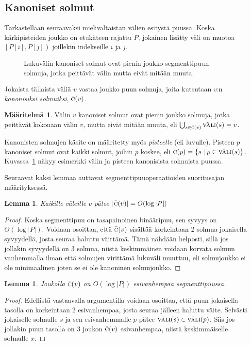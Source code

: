 \documentclass[finnish]{tktltiki2}
\newtheorem{lem}[lau]{Lemma}
\theoremstyle{definition}
\newtheorem{maar}[lau]{Määritelmä}
\theoremstyle{remark}
\newcommand\range[2]{\ensuremath{\left [ #1 , #2 \right )}\xspace}
\newcommand\set[1]{\ensuremath{\left\{#1\right\}}\xspace}
\newcommand\size[1]{\ensuremath{\left |#1\right |}\xspace}
\newcommand\epts{\ensuremath{P}\xspace}
\newcommand\inter[1]{\ensuremath{\textsc{väli}(#1)}\xspace}
\newcommand\canon[1]{\ensuremath{\bar{\textsc{c}}(#1)}\xspace}
\newcommand\canonp[1]{\ensuremath{\dot{\textsc{c}}(#1)}\xspace}
\begin{document}
\subsection{Kanoniset solmut}

Tarkastellaan seuraavaksi mielivaltaistan välien esitystä puussa.
Koska kärkipisteiden joukko on etukäteen rajattu $\epts$, jokainen lisätty väli on muotoa $\range{\epts[i]}{\epts[j]}$ joillekin indekseille $i$ ja $j$.

\begin{figure}
\caption{Lukuvälin kanoniset solmut ovat pienin joukko segmenttipuun solmuja, jotka peittävät välin mutta eivät mitään muuta.}\label{kanon}
\end{figure}

Jokaista tällaista väliä $v$ vastaa joukko puun solmuja, joita kutsutaan $v$:n \emph{kanonisiksi solmuiksi}, $\canon{v}$.
\begin{maar}\label{def:canon}
Välin $v$ kanoniset solmut ovat pienin joukko solmuja, jotka peittävät kokonaan välin $v$, mutta eivät mitään muuta, eli $\bigcup_{s\in\canon{v}}\inter{s}=v$.
\end{maar}

Kanonisten solmujen käsite on määritetty myös \emph{pisteelle} (eli luvulle).
Pisteen $p$ kanoniset solmut ovat kaikki solmut, joihin $p$ koskee, eli $\canonp{p}=\set{s \mid p\in\inter{s}}$.
Kuvassa~\ref{kanon} näkyy esimerkki välin ja pisteen kanonisista solmuista puussa.

Seuraavat kaksi lemmaa auttavat segmenttipuuoperaatioiden suoritusajan määrityksessä.

\begin{lem}\label{kanonlog}Kaikille väleille $v$ pätee $\size{\canon{v}}=O(\log\size{\epts})$\end{lem}
\begin{proof}
Koska segmenttipuu on tasapainoinen binääripuu, sen syvyys on $\Theta(\log\size{\epts})$.
Voidaan osoittaa, että $\canon{v}$ sisältää korkeintaan 2 solmua jokaisella syvyydellä, josta seuraa haluttu väittämä.
Tämä nähdään helposti, sillä jos jollakin syvyydellä on 3 solmua, niistä keskimmäinen voidaan korvata solmun vanhemmalla ilman että solmujen virittämä lukuväli muuttuu, eli solmujoukko ei ole minimaalinen joten se ei ole kanoninen solmujoukko.
\end{proof}

\begin{lem}\label{kanonplog}Joukolla $\canon{v}$ on $O(\log\size{\epts})$ esivanhempaa segmenttipuussa.\end{lem}
\begin{proof}
Edellistä vastaavalla argumentilla voidaan osoittaa, että puun jokaisella tasolla on korkeintaan 2 esivanhempaa, josta seuraa jälleen haluttu väite.
Selvästi jokaiselle solmulle $s$ ja sen esivanhemmalle $p$ pätee $\inter{s}\in\inter{p}$.
Siis jos jollakin puun tasolla on 3 joukon $\canon{v}$ esivanhempaa, niistä keskimmäiselle solmulle $x$.
\end{proof}
\end{document}
